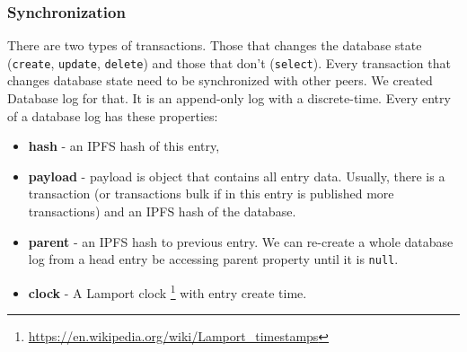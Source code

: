 \subsubsection{Synchronization}
There are two types of transactions. Those that changes the database state (\texttt{create}, \texttt{update}, \texttt{delete}) and those that don't (\texttt{select}). Every transaction that changes database state need to be synchronized with other peers. We created Database log for that. It is an append-only log with a discrete-time. Every entry of a database log has these properties:
\begin{itemize}
    \item \textbf{hash} - an IPFS hash of this entry,
    \item \textbf{payload} - payload is object that contains all entry data. Usually, there is a transaction (or transactions bulk if in this entry is published more transactions) and an IPFS hash of the database.
    \item \textbf{parent} - an IPFS hash to previous entry. We can re-create a whole database log from a head entry be accessing parent property until it is \texttt{null}.
    \item \textbf{clock} - A Lamport clock \footnote{\url{https://en.wikipedia.org/wiki/Lamport_timestamps}} with entry create time.
\end{itemize}
